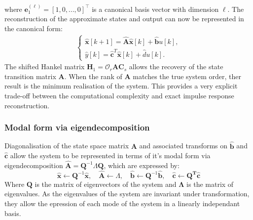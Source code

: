 where $\mathbf{e}_{1}^{(\ell)} = [1, 0, ..., 0]^{\top}$ is a canonical basis vector with dimension $\ell$. The reconstruction of the approximate states and output can now be represented in the canonical form:
\begin{align}
\label{eq:output}
\begin{cases}
    \mathbf{\hat{x}}[k+1] = \mathbf{\hat{A}} \mathbf{\hat{x}} [k] + \mathbf{\hat{b}} u[k], \\
    \hat{y} [k] = \mathbf{\hat{c}}^T \mathbf{\hat{x}} [k] + \hat{d} u[k].
\end{cases}
\end{align}
The shifted Hankel matrix $\mathbf{H}_1 = \mathcal{O}_r \mathbf{A} \mathbf{C}_s$ allows the recovery of the state transition matrix $\mathbf{A}$. When the rank of $\mathbf{A}$ matches the true system order, ther result is the minimum realisation of the system. This provides a very explicit trade-off between the computational complexity and exact impulse response reconstruction.

\subsubsection{Modal form via eigendecomposition}

Diagonalisation of the state space matrix $\mathbf{A}$ and associated transforms on $\mathbf{\hat{b}}$ and $\mathbf{\hat{c}}$ allow the system to be represented in terms of it's modal form via eigendecomposition $\mathbf{\hat{A}} = \mathbf{Q}^{-1} \Lambda \mathbf{Q}$, which are expressed by:
\begin{equation}
\label{eq:coord}
    \mathbf{\hat{x}} \leftarrow \mathbf{Q}^{-1}\mathbf{\hat{x}},
    \quad \mathbf{\hat{A}} \leftarrow \Lambda,
    \quad \mathbf{\hat{b}} \leftarrow \mathbf{Q}^{-1} \mathbf{\hat{b}},
    \quad \mathbf{\hat{c}} \leftarrow \mathbf{Q}^{\mathbf{T}} \mathbf{\hat{c}}
\end{equation}
Where $\mathbf{Q}$ is the matrix of eigenvectors of the system and $\mathbf{\Lambda}$ is the matrix of eigenvalues. As the eigenvalues of the system are invariant under transformation, they allow the epression of each mode of the system in a linearly independant basis.

